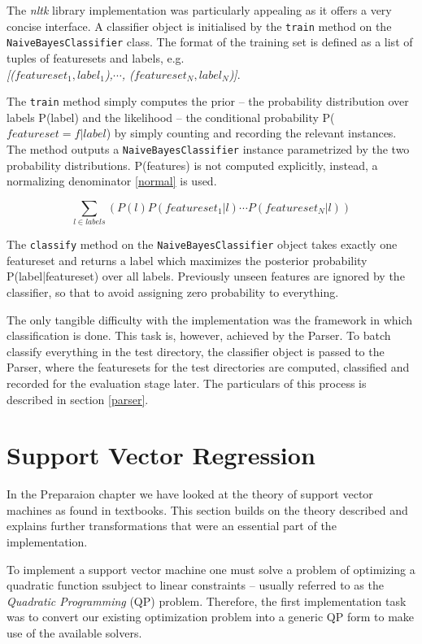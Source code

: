 \documentclass[12pt,notitlepage,twoside]{scrreprt}
\begin{document}
The \textit{nltk} library implementation was particularly appealing as it offers a very
concise interface. A classifier object is initialised by the \texttt{train}
method on the \texttt{NaiveBayesClassifier} class. The format of the training
set is defined as a list of tuples of featuresets and labels, e.g.
\\ \textit{[(\(featureset_1, label_1\)),\( \cdots\), (\(featureset_N,
label_N\))]}. 

The \texttt{train} method simply computes the prior -- the probability
distribution over labels P(label) and the likelihood -- the conditional
probability P(\(featureset=f|label\)) by simply counting and recording the
relevant instances. The method outputs a \texttt{NaiveBayesClassifier} instance
parametrized by the two probability distributions. P(features) is not
computed explicitly, instead, a normalizing denominator \ref{normal} is used.

\begin{equation} \sum_{l \in labels}(P(l)P(featureset_1|l)\cdots
  P(featureset_N|l)) \end{equation}

The \texttt{classify} method on the \texttt{NaiveBayesClassifier} object takes
exactly one featureset and returns a label which maximizes the posterior
probability P(label|featureset) over all labels.  Previously unseen features
are ignored by the classifier, so that to avoid assigning zero probability to
everything.

The only tangible difficulty with the implementation was the
framework in which classification is done. This task is, however, achieved by
the Parser.  To batch classify everything in the test directory, the classifier
object is passed to the Parser, where the featuresets for the test directories
are computed, classified and recorded for the evaluation stage later. The
particulars of this process is described in section \ref{parser}.

\section{Support Vector Regression} In the Preparaion chapter we have looked at
the theory of support vector machines as found in textbooks. This section
builds on the theory described and explains further transformations that were
an essential part of the implementation.

To implement a support vector
machine one must solve a problem of optimizing a quadratic function ssubject to
linear constraints -- usually referred to as the \textit{Quadratic
Programming} (QP) problem. Therefore, the first implementation task was to
convert our existing optimization problem into a generic QP form to make use of
the available solvers.
\end{document}
